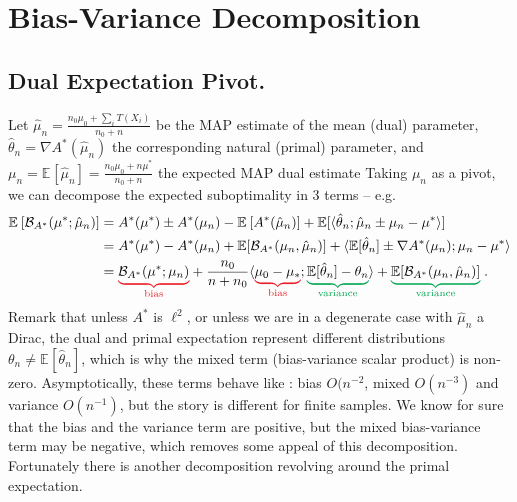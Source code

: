 \documentclass{article}
\newcommand*{\expect}[2][]{\ensuremath{\mathbb{E}_{#1} \left[ #2 \right] }} %
\newcommand{\logpart}{A}
\newcommand{\conj}{\logpart^*}
\newcommand{\bregmanconj}{\cB_{\logpart^*}}
\newcommand{\natp}{\theta}
\newcommand{\MAPm}{\hat \mu_n}
\begin{document}
\section{Bias-Variance Decomposition}
\newcommand{\bias}[1]{\textcolor{Red}{\underbrace{\textcolor{black}{#1}}_{\text{bias}}}}
\newcommand{\variance}[1]{\textcolor{Green}{\underbrace{\textcolor{black}{#1}}_{\text{variance}}}}

\subsection{Dual Expectation Pivot.}
Let $\hat \mu_n = \frac{n_0 \mu_0 + \sum_i T(X_i)}{n_0 + n}$ be the MAP estimate of the mean (dual) parameter, $\hat \natp_n = \nabla \conj(\hat \mu_n)$ the corresponding natural (primal) parameter, and
$\mu_n = \expect{\hat \mu_n} = \frac{n_0 \mu_0 + n \mu^*}{n_0 + n}$ the expected MAP dual estimate
Taking $\mu_n$ as a pivot, we can decompose the expected suboptimality in 3 terms -- e.g. 
\begin{align}
	\expect{\bregmanconj(\mu^* ; \hat \mu_n)} 
	&= \conj(\mu^* ) 
	\pm \conj(\mu_n)
	-  \expect{\conj(\hat \mu_n)}
	+ \E[\langle \hat \natp_n ; \hat \mu_n   \pm \mu_n - \mu^*  \rangle ] 
	\nonumber \\
	&= \conj(\mu^* ) 
	- \conj(\mu_n)  + \E[\bregmanconj(\mu_n, \MAPm)]
	+ \langle \E[\hat \natp_n] \pm \nabla \conj(\mu_n) ;  \mu_n - \mu^* \rangle
	\nonumber\\
	& = \bias{\bregmanconj(\mu^*; \mu_n)}
	+ \frac{n_0}{n+n_0} \langle  \bias{\mu_0 - \mu_*} ; \variance{\E[\hat \natp_n] - \natp_n} \rangle 
	+ \variance{\E[\bregmanconj(\mu_n, \MAPm)]} \; .
	\label{eq:bias-mixed-variance}
\end{align}
Remark that unless $\conj$ is $\ell^2$, or unless we are in a degenerate case with $\hat \mu_n$ a Dirac, the dual and primal expectation represent different distributions $\theta_n \neq \expect{\hat \theta_n}$, which is why the mixed term (bias-variance scalar product) is non-zero.
Asymptotically, these terms behave like : bias $O(n^{-2}$, mixed $O(n^{-3})$ and variance $O(n^{-1})$, but the story is different for finite samples.
We know for sure that the bias and the variance term are positive, but the mixed bias-variance term may be negative, which removes some appeal of this decomposition. 
Fortunately there is another decomposition revolving around the primal expectation.

\end{document}
